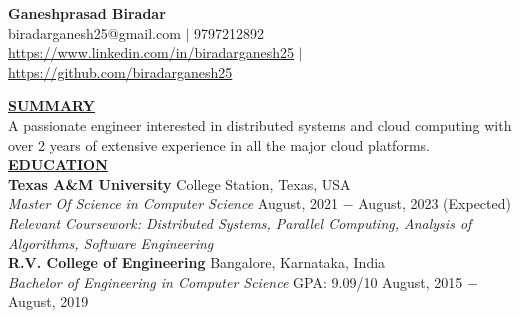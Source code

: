 \documentclass{article}
\begin{document}
\begin{center}
\large \textbf{Ganeshprasad Biradar \\}
\normalsize biradarganesh25@gmail.com $\mid$ 9797212892 \\ \url{https://www.linkedin.com/in/biradarganesh25} $\mid$ \url{https://github.com/biradarganesh25} \\
\hrulefill
\end{center}


\noindent \textbf{\underline{SUMMARY}} \\
\noindent A passionate engineer interested in distributed systems and cloud computing with over 2 years of extensive experience in all the major cloud platforms. \\



\noindent \textbf{\underline{EDUCATION}} \\
\textbf{Texas A\&M University} \hfill College Station, Texas, USA \\
\textit{Master Of Science in Computer Science}  \hfill August, 2021 $-$ August, 2023 (Expected) \\
\textit{Relevant Coursework: Distributed Systems, Parallel Computing, Analysis of Algorithms, Software Engineering}\\

\noindent \textbf{R.V. College of Engineering} \hfill Bangalore, Karnataka, India \\
\textit{Bachelor of Engineering in Computer Science} \hspace{1.1cm} GPA: 9.09/10 \hfill August, 2015 $-$ August, 2019 \\
\end{document}
